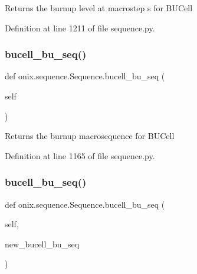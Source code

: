 \begin{DoxyVerb}Returns the burnup level at macrostep s for BUCell\end{DoxyVerb}
 

Definition at line 1211 of file sequence.\+py.

\mbox{\label{classonix_1_1sequence_1_1Sequence_afb77125acf18a4aa9f7bae89253684f0}} 
\subsubsection{\texorpdfstring{bucell\+\_\+bu\+\_\+seq()}{bucell\_bu\_seq()}\hspace{0.1cm}{\footnotesize\ttfamily [1/2]}}
{\footnotesize\ttfamily def onix.\+sequence.\+Sequence.\+bucell\+\_\+bu\+\_\+seq (\begin{DoxyParamCaption}\item[{}]{self }\end{DoxyParamCaption})}

\begin{DoxyVerb}Returns the burnup macrosequence for BUCell
\end{DoxyVerb}
 

Definition at line 1165 of file sequence.\+py.

\mbox{\label{classonix_1_1sequence_1_1Sequence_a9d8dfff357d1253c857116e8ea58fc82}} 
\subsubsection{\texorpdfstring{bucell\+\_\+bu\+\_\+seq()}{bucell\_bu\_seq()}\hspace{0.1cm}{\footnotesize\ttfamily [2/2]}}
{\footnotesize\ttfamily def onix.\+sequence.\+Sequence.\+bucell\+\_\+bu\+\_\+seq (\begin{DoxyParamCaption}\item[{}]{self,  }\item[{}]{new\+\_\+bucell\+\_\+bu\+\_\+seq }\end{DoxyParamCaption})}

